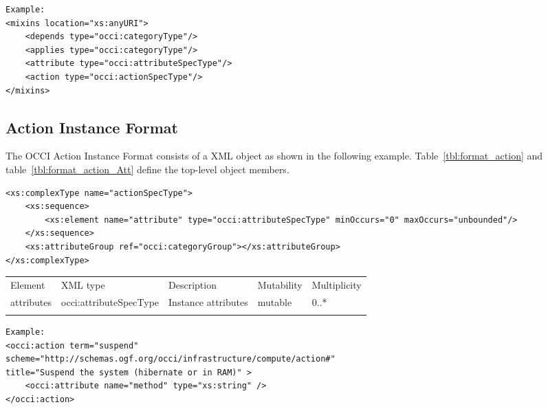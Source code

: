\documentclass[10pt,a4paper]{article}
\begin{document}
\begin{lstlisting}
Example:
<mixins location="xs:anyURI">
	<depends type="occi:categoryType"/>
	<applies type="occi:categoryType"/>
	<attribute type="occi:attributeSpecType"/>
	<action type="occi:actionSpecType"/>
</mixins>
\end{lstlisting}

\subsection{Action Instance Format}
\label{sec:format_action}

The OCCI Action Instance Format consists of a XML object as shown in the
following example.
Table~\ref{tbl:format_action} and table~\ref{tbl:format_action_Att} define the top-level object members.

\begin{lstlisting}
<xs:complexType name="actionSpecType">
	<xs:sequence>
		<xs:element name="attribute" type="occi:attributeSpecType" minOccurs="0" maxOccurs="unbounded"/>
	</xs:sequence>
	<xs:attributeGroup ref="occi:categoryGroup"></xs:attributeGroup>
</xs:complexType>
\end{lstlisting}

 {
    \begin{tabularx}{\textwidth}{llXll}
    \toprule
    Element & XML type & Description & Mutability & Multiplicity \\
    \colrule
    
    attributes & occi:attributeSpecType & Instance attributes & mutable & 0..* \\ 
    \botrule
    \end{tabularx}
}
\FloatBarrier

\begin{lstlisting}
Example:
<occi:action term="suspend"
scheme="http://schemas.ogf.org/occi/infrastructure/compute/action#"
title="Suspend the system (hibernate or in RAM)" >
	<occi:attribute name="method" type="xs:string" />
</occi:action>
\end{lstlisting}
\end{document}
